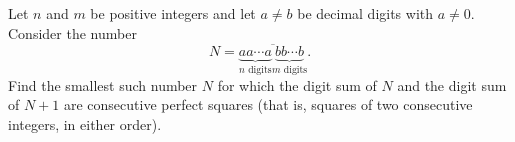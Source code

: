 Let $n$ and $m$ be positive integers and let $a\ne b$ be decimal digits with $a\ne0$. Consider the number
\[N=\overline{\underbrace{aa\cdots a}_{n\text{ digits}}\underbrace{bb\cdots b}_{m\text{ digits}}}.\]
Find the smallest such number $N$ for which the digit sum of $N$ and the digit sum of $N+1$ are consecutive perfect squares (that is, squares of two consecutive integers, in either order).
